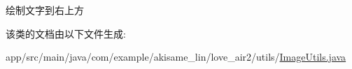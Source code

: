 绘制文字到右上方 

该类的文档由以下文件生成\+:\begin{DoxyCompactItemize}
\item 
app/src/main/java/com/example/akisame\+\_\+lin/love\+\_\+air2/utils/\mbox{\hyperlink{_image_utils_8java}{Image\+Utils.\+java}}\end{DoxyCompactItemize}
